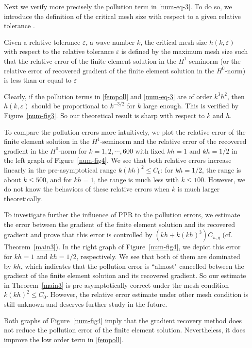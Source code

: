 \documentclass[leqno,final]{siamltex}
\numberwithin{equation}{section}
\newcommand{\ep}{\varepsilon}
\begin{document}
Next we verify more precisely the pollution term in \eqref{num-eq-3}. To do so, we introduce the definition of the critical mesh size with respect to
a given relative tolerance \cite{w,dw}.
\begin{definition}
Given a relative tolerance $\ep$, a wave number $k$, the critical mesh size $h(k,\ep)$ with respect to the relative tolerance $\ep$ is defined by the
maximum mesh size such that the relative error of the finite element solution in {the} $H^1$-seminorm (or the relative error of recovered gradient of the finite element solution in {the} $H^0$-norm) is less than or equal to $\ep$
\end{definition}

Clearly, if the pollution terms in \eqref{fempoll} and \eqref{num-eq-3} are of order $k^3h^2$, then $h(k,\ep)$
should be proportional to $k^{-3/2}$ for $k$ large enough. This is verified by Figure~\ref{num-fig3}.
So our theoretical result is sharp with respect to $k$ and $h$.

To compare the pollution errors more intuitively, we plot
the relative error of the finite element solution in the $H^1$-seminorm
and the relative error of the recovered gradient in the $H^0$-norm for
$k=1,2,\cdots,600$ with fixed $kh=1$ and $kh=1/2$ in the left graph of Figure~\ref{num-fig4}.
We see that both relative errors increase linearly in the pre-asymptotical range $k(kh)^2\leq C_0$:
for $kh=1/2$, the range is about $k\leq500$, and for $kh=1$, the range is much less with $k\leq100$.
However, we do not know the behaviors of these relative errors when $k$ is much larger theoretically.

To investigate further the influence of PPR to the pollution errors, we estimate the error between the gradient of the finite element solution and its recovered gradient
and prove that this error is controlled by $(kh+k(kh)^3)C_{u,g}$ (cf. Theorem~\ref{main3}).
In the right graph of Figure~\ref{num-fig4}, we depict this error for $kh=1$ and $kh=1/2$, respectively. We see that both of them are dominated by $kh$, which indicates that the pollution error is ``almost" cancelled
between the gradient of the finite element solution and its recovered gradient.
So our estimate in Theorem~\ref{main3} is pre-asymptotically correct under the mesh condition $k(kh)^2\leq C_0$.
However, the relative error estimate under other mesh condition is still unknown and deserves further study in the future.

Both graphs of Figure~\ref{num-fig4} imply that the gradient recovery method does not reduce the pollution error of
the finite element solution. Nevertheless, it does
improve the low order term in \eqref{fempoll}.
\end{document}
